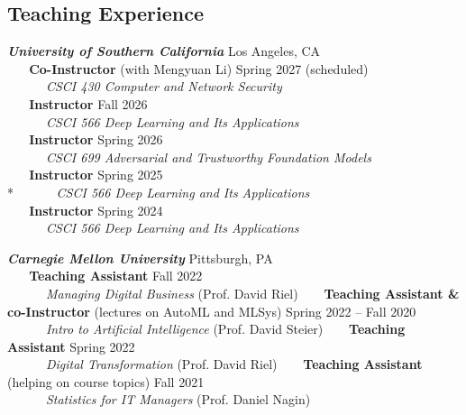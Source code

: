 \documentclass[margin,line,pifont,palatino,courier]{res}
\begin{document}
\begin{resume}
\section{\sc Teaching Experience}

\textit{\textbf{University of Southern California}} \hfill Los Angeles, CA\\
\-\textbf{~~~Co-Instructor} (with Mengyuan Li) \hfill Spring 2027 (scheduled)\\
\-\textit{~~~~~~CSCI 430 Computer and Network Security}\\
\-\textbf{~~~Instructor}   \hfill Fall 2026\\
\-\textit{~~~~~~CSCI 566 Deep Learning and Its Applications}\\
\-\textbf{~~~Instructor}   \hfill Spring 2026 \\
\-\textit{~~~~~~CSCI 699 Adversarial and Trustworthy Foundation Models}\\
\-\textbf{~~~Instructor}   \hfill Spring 2025 \\*
\-\textit{~~~~~~CSCI 566 Deep Learning and Its Applications}\\
\-\textbf{~~~Instructor}   \hfill Spring 2024 \\
\-\textit{~~~~~~CSCI 566 Deep Learning and Its Applications}
\vskip -2mm

\textit{\textbf{Carnegie Mellon University}} \hfill Pittsburgh, PA\\
\-\textbf{~~~Teaching Assistant}   \hfill Fall 2022 \\
\-\textit{~~~~~~Managing Digital Business}  (Prof. David Riel)
\vskip -2mm
\-\textbf{~~~Teaching Assistant \& co-Instructor} (lectures on AutoML and MLSys)  \hfill Spring 2022  -- Fall 2020\\ 
\-\textit{~~~~~~Intro to Artificial Intelligence} (Prof. David Steier)
\vskip -2mm
\-\textbf{~~~Teaching Assistant}   \hfill Spring 2022 \\
\-\textit{~~~~~~Digital Transformation}  (Prof. David Riel)
\vskip -2mm
\-\textbf{~~~Teaching Assistant} (helping on course topics)  \hfill Fall 2021 \\
\-\textit{~~~~~~Statistics for IT Managers} (Prof. Daniel Nagin)  \hfill


\end{resume}
\end{document}
